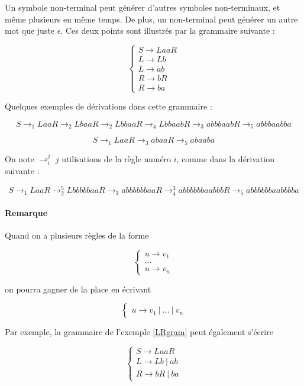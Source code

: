\begin{example}
\label{LRgram}
Un symbole non-terminal peut générer d'autres symboles non-terminaux, et même plusieurs en même temps. De plus, un non-terminal peut générer un autre mot que juste $\epsilon$. Ces deux points sont illustrés par la grammaire suivante :

\[
\begin{cases}
S \rightarrow LaaR \\
L \rightarrow Lb \\
L \rightarrow ab \\
R \rightarrow bR \\
R \rightarrow ba
\end{cases}
\]

Quelques exemples de dérivations dans cette grammaire :

\[
 S \rightarrow_1 LaaR \rightarrow_2 LbaaR \rightarrow_2 LbbaaR \rightarrow_4 LbbaabR \rightarrow_3 abbbaabR \rightarrow_5 abbbaabba
\]

\[
 S \rightarrow_1 LaaR \rightarrow_3 abaaR \rightarrow_5 abaaba
 \]
 
 On note $\rightarrow_i^j$ $j$ utilisations de la règle numéro $i$, comme dans la dérivation suivante :
 
 \[
 S \rightarrow_1 LaaR \rightarrow_2^5 LbbbbbaaR \rightarrow_3 abbbbbbaaR \rightarrow_4^3 abbbbbbaabbbR \rightarrow_5 abbbbbbaabbbba
 \]

\end{example}

\paragraph{Remarque} Quand on a plusieurs règles de la forme

\[
\begin{cases}
u \rightarrow v_1 \\
... \\
u \rightarrow v_n
\end{cases}
\]

on pourra gagner de la place en écrivant 

\[
\begin{cases}
u \rightarrow v_1~|~...~|~v_n
\end{cases}
\]

Par exemple, la grammaire de l'exemple \ref{LRgram} peut également s'écrire 

\[
\begin{cases}
S \rightarrow LaaR \\
L \rightarrow Lb~|~ab \\
R \rightarrow bR~|~ba 
\end{cases}
\]

